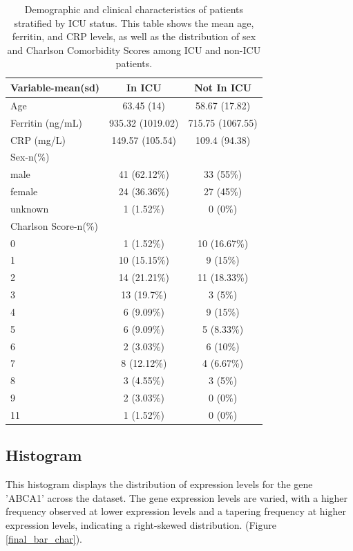 \documentclass[12pt]{article}
\begin{document}
\begin{table}[H]
\centering
\begin{tabular}{lcc}
\toprule
Variable-mean(sd) & In ICU & Not In ICU\\
\midrule
Age & 63.45 (14) & 58.67 (17.82)\\
Ferritin (ng/mL) & 935.32 (1019.02) & 715.75 (1067.55)\\
CRP (mg/L) & 149.57 (105.54) & 109.4 (94.38)\\
\addlinespace
\midrule
Sex-n(\%) &  & \\
\midrule
male & 41 (62.12\%) & 33 (55\%)\\
female & 24 (36.36\%) & 27 (45\%)\\
unknown & 1 (1.52\%) & 0 (0\%)\\
\midrule
Charlson Score-n(\%) &  & \\
\midrule
0 & 1 (1.52\%) & 10 (16.67\%)\\
1 & 10 (15.15\%) & 9 (15\%)\\
2 & 14 (21.21\%) & 11 (18.33\%)\\
3 & 13 (19.7\%) & 3 (5\%)\\
4 & 6 (9.09\%) & 9 (15\%)\\
5 & 6 (9.09\%) & 5 (8.33\%)\\
6 & 2 (3.03\%) & 6 (10\%)\\
7 & 8 (12.12\%) & 4 (6.67\%)\\
8 & 3 (4.55\%) & 3 (5\%)\\
9 & 2 (3.03\%) & 0 (0\%)\\
11 & 1 (1.52\%) & 0 (0\%)\\
\bottomrule
\end{tabular}

\caption{Demographic and clinical characteristics of patients stratified by ICU status. This table shows the mean age, ferritin, and CRP levels, as well as the distribution of sex and Charlson Comorbidity Scores among ICU and non-ICU patients.}
\label{summary table}
\end{table}

\subsection{Histogram}
This histogram displays the distribution of expression levels for the gene 'ABCA1' across the dataset. The gene expression levels are varied, with a higher frequency observed at lower expression levels and a tapering frequency at higher expression levels, indicating a right-skewed distribution. (Figure \ref{final_bar_char}).
\end{document}
